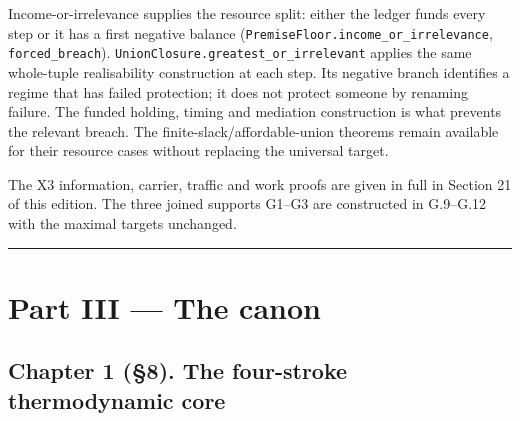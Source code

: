 \documentclass[
]{article}
\begin{document}
Income-or-irrelevance supplies the resource split: either the ledger
funds every step or it has a first negative balance
(\texttt{P\allowbreak{}r\allowbreak{}e\allowbreak{}m\allowbreak{}i\allowbreak{}s\allowbreak{}e\allowbreak{}F\allowbreak{}l\allowbreak{}o\allowbreak{}o\allowbreak{}r\allowbreak{}.\allowbreak{}i\allowbreak{}n\allowbreak{}c\allowbreak{}o\allowbreak{}m\allowbreak{}e\allowbreak{}\_\allowbreak{}o\allowbreak{}r\allowbreak{}\_\allowbreak{}i\allowbreak{}r\allowbreak{}r\allowbreak{}e\allowbreak{}l\allowbreak{}e\allowbreak{}v\allowbreak{}a\allowbreak{}n\allowbreak{}c\allowbreak{}e},
\texttt{forced\_breach}).
\texttt{U\allowbreak{}n\allowbreak{}i\allowbreak{}o\allowbreak{}n\allowbreak{}C\allowbreak{}l\allowbreak{}o\allowbreak{}s\allowbreak{}u\allowbreak{}r\allowbreak{}e\allowbreak{}.\allowbreak{}g\allowbreak{}r\allowbreak{}e\allowbreak{}a\allowbreak{}t\allowbreak{}e\allowbreak{}s\allowbreak{}t\allowbreak{}\_\allowbreak{}o\allowbreak{}r\allowbreak{}\_\allowbreak{}i\allowbreak{}r\allowbreak{}r\allowbreak{}e\allowbreak{}l\allowbreak{}e\allowbreak{}v\allowbreak{}a\allowbreak{}n\allowbreak{}t}
applies the same whole-tuple realisability construction at each step.
Its negative branch identifies a regime that has failed protection; it
does not protect someone by renaming failure. The funded holding, timing
and mediation construction is what prevents the relevant breach. The
f\allowbreak{}i\allowbreak{}n\allowbreak{}i\allowbreak{}t\allowbreak{}e\allowbreak{}-\allowbreak{}s\allowbreak{}l\allowbreak{}a\allowbreak{}c\allowbreak{}k\allowbreak{}/\allowbreak{}a\allowbreak{}f\allowbreak{}f\allowbreak{}o\allowbreak{}r\allowbreak{}d\allowbreak{}a\allowbreak{}b\allowbreak{}l\allowbreak{}e\allowbreak{}-\allowbreak{}u\allowbreak{}n\allowbreak{}i\allowbreak{}o\allowbreak{}n
theorems remain available for their resource cases without replacing the
universal target.

The X3 information, carrier, traffic and work proofs are given in full
in Section 21 of this edition. The three joined supports G1--G3 are
constructed in G.9--G.12 with the maximal targets unchanged.

\begin{center}\rule{0.5\linewidth}{0.5pt}\end{center}

\section{Part III --- The canon}\label{part-iii-the-canon}

\subsection{Chapter 1 (§8). The four-stroke thermodynamic
core}\label{chapter-1-8.-the-four-stroke-thermodynamic-core}
\end{document}
